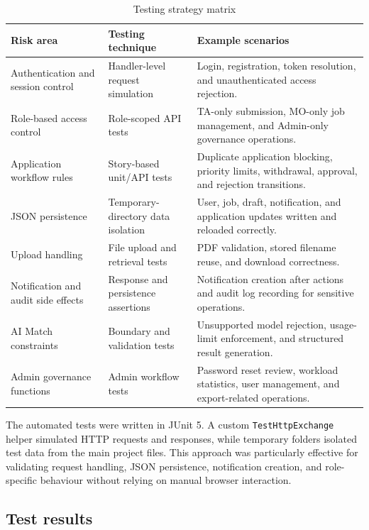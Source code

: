 \documentclass[11pt,a4paper]{article}
\begin{document}
\begin{table}[htbp]
\centering
\footnotesize
\caption{Testing strategy matrix}
\begin{tabularx}{\textwidth}{M{0.23\textwidth} M{0.25\textwidth} Y}
\toprule
\textbf{Risk area} & \textbf{Testing technique} & \textbf{Example scenarios} \\
\midrule
Authentication and session control & Handler-level request simulation & Login, registration, token resolution, and unauthenticated access rejection. \\
Role-based access control & Role-scoped API tests & TA-only submission, MO-only job management, and Admin-only governance operations. \\
Application workflow rules & Story-based unit/API tests & Duplicate application blocking, priority limits, withdrawal, approval, and rejection transitions. \\
JSON persistence & Temporary-directory data isolation & User, job, draft, notification, and application updates written and reloaded correctly. \\
Upload handling & File upload and retrieval tests & PDF validation, stored filename reuse, and download correctness. \\
Notification and audit side effects & Response and persistence assertions & Notification creation after actions and audit log recording for sensitive operations. \\
AI Match constraints & Boundary and validation tests & Unsupported model rejection, usage-limit enforcement, and structured result generation. \\
Admin governance functions & Admin workflow tests & Password reset review, workload statistics, user management, and export-related operations. \\
\bottomrule
\end{tabularx}
\end{table}

The automated tests were written in JUnit 5. A custom \texttt{TestHttpExchange} helper simulated HTTP requests and responses, while temporary folders isolated test data from the main project files. This approach was particularly effective for validating request handling, JSON persistence, notification creation, and role-specific behaviour without relying on manual browser interaction.

\subsection{Test results}
\end{document}

